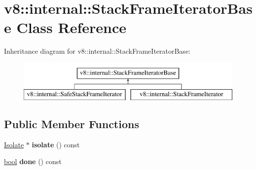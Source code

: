 \hypertarget{classv8_1_1internal_1_1StackFrameIteratorBase}{}\section{v8\+:\+:internal\+:\+:Stack\+Frame\+Iterator\+Base Class Reference}
\label{classv8_1_1internal_1_1StackFrameIteratorBase}
Inheritance diagram for v8\+:\+:internal\+:\+:Stack\+Frame\+Iterator\+Base\+:\begin{figure}[H]
\begin{center}
\leavevmode
\includegraphics[height=2.000000cm]{classv8_1_1internal_1_1StackFrameIteratorBase}
\end{center}
\end{figure}
\subsection*{Public Member Functions}
\begin{DoxyCompactItemize}
\item 
\mbox{\label{classv8_1_1internal_1_1StackFrameIteratorBase_ab1fa93e71e03a220931fa15c943b4720}} 
\mbox{\hyperlink{classv8_1_1internal_1_1Isolate}{Isolate}} $\ast$ {\bfseries isolate} () const
\item 
\mbox{\label{classv8_1_1internal_1_1StackFrameIteratorBase_a0fdde3eed7621e64ee5e1a6ea0799c4b}} 
\mbox{\hyperlink{classbool}{bool}} {\bfseries done} () const
\end{DoxyCompactItemize}
